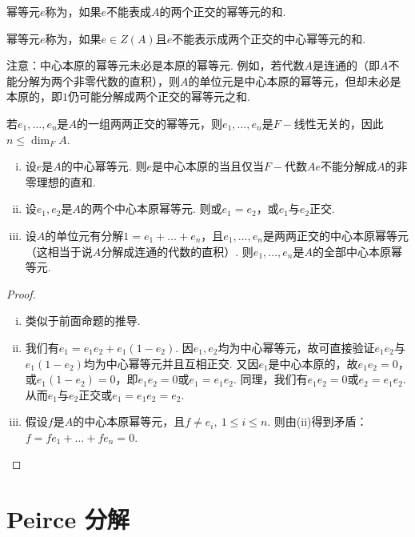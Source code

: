 \begin{definition}
    幂等元$e$称为，如果$e$不能表成$A$的两个正交的幂等元的和.\par 
    幂等元$e$称为，如果$e \in Z(A)$且$e$不能表示成两个正交的中心幂等元的和.
\end{definition}

注意：中心本原的幂等元未必是本原的幂等元. 例如，若代数$A$是连通的（即$A$不能分解为两个非零代数的直积），则$A$的单位元是中心本原的幂等元，但却未必是本原的，即$1$仍可能分解成两个正交的幂等元之和.\par
若$e_1, \dots, e_n$是$A$的一组两两正交的幂等元，则$e_1, \dots, e_n$是$F-\!\!$线性无关的，因此$n \le \dim_F A$.

\begin{proposition}[]
    \begin{enumerate}[(i)]
        \item 设$e$是$A$的中心幂等元. 则$e$是中心本原的当且仅当$F-\!\!$代数$Ae$不能分解成$A$的非零理想的直和.
        \item 设$e_1, e_2$是$A$的两个中心本原幂等元. 则或$e_1 = e_2$，或$e_1$与$e_2$正交.
        \item 设$A$的单位元有分解$1 = e_1 + \dots + e_n$，且$e_1, \dots, e_n$是两两正交的中心本原幂等元（这相当于说$A$分解成连通的代数的直积）. 则$e_1, \dots, e_n$是$A$的全部中心本原幂等元.
    \end{enumerate}
\end{proposition}

\begin{proof}
    \begin{enumerate}[(i)]
        \item 类似于前面命题的推导.
        \item 我们有$e_1 = e_1 e_2 + e_1(1 - e_2)$. 因$e_1, e_2$均为中心幂等元，故可直接验证$e_1 e_2$与$e_1(1 - e_2)$均为中心幂等元并且互相正交. 又因$e_1$是中心本原的，故$e_1 e_2 = 0$，或$e_1(1 - e_2) = 0$，即$e_1 e_2 = 0$或$e_1 = e_1 e_2$.
        同理，我们有$e_1 e_2 = 0$或$e_2 = e_1 e_2$. 从而$e_1$与$e_2$正交或$e_1 = e_1 e_2 = e_2$.
        \item 假设$f$是$A$的中心本原幂等元，且$f \neq e_i,\ 1 \le i \le n$. 则由(ii)得到矛盾：$f = f e_1 + \dots + f e_n = 0$. \qedhere
    \end{enumerate}
\end{proof}

\section{Peirce 分解}

